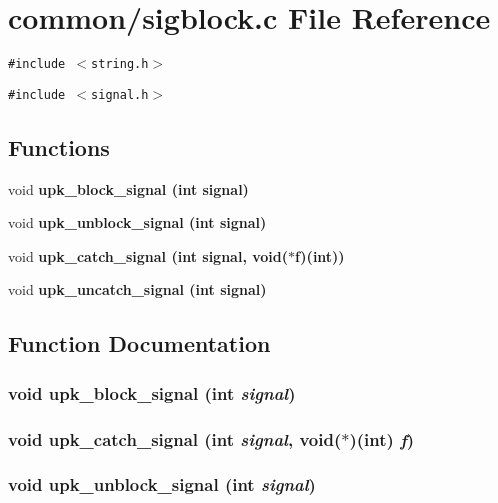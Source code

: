 \section{common/sigblock.c File Reference}
\label{sigblock_8c}
{\tt \#include $<$string.h$>$}\par
{\tt \#include $<$signal.h$>$}\par
\subsection*{Functions}
\begin{CompactItemize}
\item 
void \bf{upk\_\-block\_\-signal} (int signal)
\item 
void \bf{upk\_\-unblock\_\-signal} (int signal)
\item 
void \bf{upk\_\-catch\_\-signal} (int signal, void($\ast$f)(int))
\item 
void \bf{upk\_\-uncatch\_\-signal} (int signal)
\end{CompactItemize}


\subsection{Function Documentation}
\subsubsection{\setlength{\rightskip}{0pt plus 5cm}void upk\_\-block\_\-signal (int {\em signal})}\label{sigblock_8c_6dfde8bf2e2526a9a2388c56492d29ce}


\subsubsection{\setlength{\rightskip}{0pt plus 5cm}void upk\_\-catch\_\-signal (int {\em signal}, void($\ast$)(int) {\em f})}\label{sigblock_8c_55a99761f4841772cb59aac5f07d4466}


\subsubsection{\setlength{\rightskip}{0pt plus 5cm}void upk\_\-unblock\_\-signal (int {\em signal})}\label{sigblock_8c_77eb01608615602ac0ac56535897d6e4}


